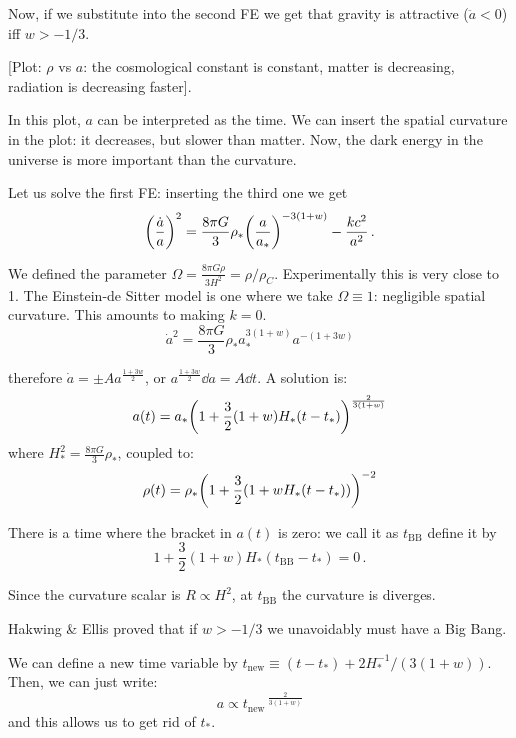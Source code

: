 \documentclass[main.tex]{subfiles}
\begin{document}
Now, if we substitute into the second FE we get that gravity is attractive (\(\ddot{a} < 0 \)) iff \(w > -1/3\). 

[Plot: \(\rho\) vs \(a\): the cosmological constant is constant, matter is decreasing, radiation is decreasing faster].

In this plot, \(a\) can be interpreted as the time.
We can insert the spatial curvature in the plot: it decreases, but slower than matter. 
Now, the dark energy in the universe is more important than the curvature. 

Let us solve the first FE: inserting the third one we get
\begin{equation}
  \qty(\frac{\dot{a} }{a})^2 = 
  \frac{8 \pi G}{3} \rho_* \qty(\frac{a}{a_*}) ^{-3 (1+w)} - \frac{kc^2}{a^2}\,.
\end{equation}

We defined the parameter \(\Omega = \frac{8 \pi G \rho}{3 H^2} = \rho / \rho_C\).
Experimentally this is very close to 1.
The Einstein-de Sitter model is one where we take \(\Omega \equiv 1\): negligible spatial curvature. This amounts to making \(k=0\).
\begin{equation}
  \dot{a}^2 = \frac{8 \pi G}{3} \rho_* a_{*}^{3 (1+w)} a^{-(1+3w)}
\end{equation}

therefore \(\dot{a} = \pm A a^{\frac{1+3w}{2}}\), or \(a ^{\frac{1+3w}{2}}\dd{a} = A \dd{t}\). A solution is:
\begin{equation}
  a(t)= a_{*} \qty(
    1 + \frac{3}{2} (1+w) H_{*} (t - t_{*})
  )^{\frac{2}{3(1+w)}}
\end{equation}
where \(H_{*}^2 = \frac{8 \pi G}{3} \rho_{*}\), coupled to:
\begin{equation}
  \rho(t) = \rho_{*} \qty(1 + \frac{3}{2}(1+w H_* (t-t_*)))^{-2}
\end{equation}

There is a time where the bracket in \(a(t)\) is zero: we call it as \(t_{\text{BB}}\) define it by
\begin{equation}
  1 + \frac{3}{2} (1+w) H_{*} (t_{\text{BB}} - t_* ) = 0\,.
\end{equation}

Since the curvature scalar is \(R \propto H^2\), at \(t_{\text{BB}}\)  the curvature is diverges.

Hakwing \& Ellis proved that if \(w>-1/3\) we unavoidably must have a Big Bang.

We can define a new time variable by \(t_{\text{new}} \equiv (t - t_{*}) + 2 H_*^{-1} / (3 (1+w))\). Then, we can just write:
\begin{equation}
  a \propto t_{\text{new}}\,^{\frac{2}{3(1+w)}}
\end{equation}
and this allows us to get rid of \(t_{*}\).
\end{document}

